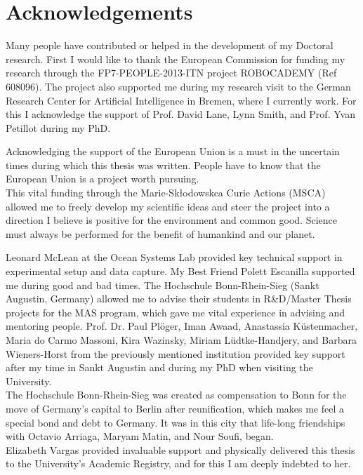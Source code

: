 \documentclass[a4paper, notoc, oneside, openany]{tufte-book} %
\begin{document}
\chapter{Acknowledgements}
\thispagestyle{empty}
Many people have contributed or helped in the development of my Doctoral research. First I would like to thank the European Commission for funding my research through the FP7-PEOPLE-2013-ITN project ROBOCADEMY (Ref 608096). The project also supported me during my research visit to the German Research Center for Artificial Intelligence in Bremen, where I currently work. For this I acknowledge the support of Prof. David Lane, Lynn Smith, and Prof. Yvan Petillot during my PhD.

Acknowledging the support of the European Union is a must in the uncertain times during which this thesis was written. People have to know that the European Union is a project worth pursuing.\\

This vital funding through the Marie-Skłodowskca Curie Actions (MSCA) allowed me to freely develop my scientific ideas and steer the project into a direction I believe is positive for the environment and common good. Science must always be performed for the benefit of humankind and our planet. 

Leonard McLean at the Ocean Systems Lab provided key technical support in experimental setup and data capture. My Best Friend Polett Escanilla supported me during good and bad times. The Hochschule Bonn-Rhein-Sieg (Sankt Augustin, Germany) allowed me to advise their students in R\&D/Master Thesis projects for the MAS program, which gave me vital experience in advising and mentoring people. Prof. Dr. Paul Plöger, Iman Awaad, Anastassia Küstenmacher, Maria do Carmo Massoni, Kira Wazinsky, Miriam Lüdtke-Handjery, and Barbara Wieners-Horst from the previously mentioned institution provided key support after my time in Sankt Augustin and during my PhD when visiting the University.\\

The Hochschule Bonn-Rhein-Sieg was created as compensation to Bonn for the move of Germany's capital to Berlin after reunification, which makes me feel a special bond and debt to Germany. It was in this city that life-long friendships with Octavio Arriaga, Maryam Matin, and Nour Soufi, began.\\

Elizabeth Vargas provided invaluable support and physically delivered this thesis to the University's Academic Registry, and for this I am deeply indebted to her.
\end{document}
